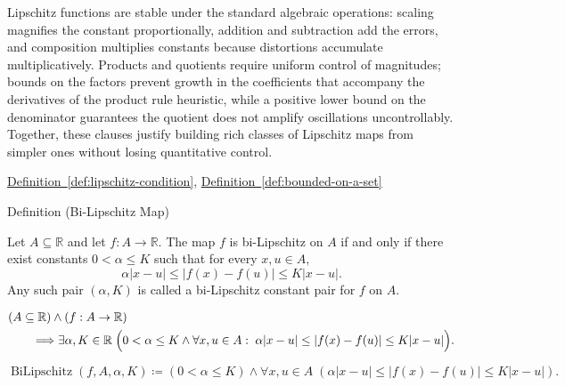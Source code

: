 \begin{remark*}[Interpretation]
Lipschitz functions are stable under the standard algebraic operations: scaling magnifies the constant proportionally, addition and subtraction add the errors, and composition multiplies constants because distortions accumulate multiplicatively. Products and quotients require uniform control of magnitudes; bounds on the factors prevent growth in the coefficients that accompany the derivatives of the product rule heuristic, while a positive lower bound on the denominator guarantees the quotient does not amplify oscillations uncontrollably. Together, these clauses justify building rich classes of Lipschitz maps from simpler ones without losing quantitative control.
\end{remark*}

\begin{dependencies}
\hyperref[def:lipschitz-condition]{Definition~\ref{def:lipschitz-condition}}, \hyperref[def:bounded-on-a-set]{Definition~\ref{def:bounded-on-a-set}}
\end{dependencies}


\begin{definitionbox}{Definition (Bi-Lipschitz Map)}
\begin{definition}
\label{def:bi-lipschitz}
Let $A\subseteq \mathbb{R}$ and let $f:A\to\mathbb{R}$. The map $f$ is bi-Lipschitz on $A$ if and only if there exist constants $0<\alpha\le K$ such that for every $x,u\in A$,
\[
\alpha|x-u|\le |f(x)-f(u)|\le K|x-u|.
\]
Any such pair $(\alpha,K)$ is called a bi-Lipschitz constant pair for $f$ on $A$.
\end{definition}
\end{definitionbox}

\begin{remark*}
\[
\begin{aligned}
&(A\subseteq\mathbb{R})\land(f:A\to\mathbb{R})\\
&\qquad\Longrightarrow
\exists \alpha,K\in\mathbb{R}\;\Bigl(0<\alpha\le K
\land \forall x,u\in A:\; \alpha|x-u|\le |f(x)-f(u)|\le K|x-u|\Bigr).
\end{aligned}
\]
\end{remark*}

\begin{remark*}
\[
\operatorname{BiLipschitz}(f,A,\alpha,K) \coloneqq \left(0<\alpha\le K\right) \land \forall x,u\in A\; \left(\alpha|x-u|\le |f(x)-f(u)|\le K|x-u|\right).
\]
\end{remark*}


